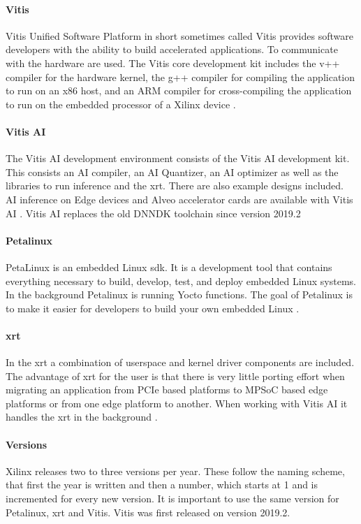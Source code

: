 \paragraph{Vitis}
Vitis Unified Software Platform in short sometimes called Vitis provides software developers with the ability to build accelerated applications.
To communicate with the hardware  are used.
The Vitis core development kit includes the v++ compiler for the hardware kernel, the g++ compiler for compiling the application to run on an x86 host, and an ARM compiler for cross-compiling the application to run on the embedded processor of a Xilinx device \cite{vitis_user_guide}.

\paragraph{Vitis AI}
The Vitis AI development environment consists of the Vitis AI development kit.
This consists an AI compiler, an AI Quantizer, an AI optimizer as well as the libraries to run inference and the \acrfull{xrt}.
There are also example designs included.
AI inference on Edge devices and Alveo accelerator cards are available with Vitis AI \cite{vitis_ai_user_guide}.
Vitis AI replaces the old DNNDK toolchain since version 2019.2 

\paragraph{Petalinux}
PetaLinux is an embedded Linux \acrfull{sdk}.
It is a development tool that contains everything necessary to build, develop, test, and deploy embedded Linux systems.
In the background Petalinux is running Yocto functions.
The goal of Petalinux is to make it easier for developers to build your own embedded Linux \cite{petalinux_user_guide}.

\paragraph{\acrfull{xrt}}
In the \acrfull{xrt} a combination of userspace and kernel driver components are included.
The advantage of \acrshort{xrt} for the user is that there is very little porting effort when migrating an application from PCIe based platforms to MPSoC based edge platforms or from one edge platform to another.
When working with Vitis AI it handles the \acrshort{xrt} in the background \cite{xrt_overview}.

\paragraph{Versions}
Xilinx releases two to three versions per year.
These follow the naming scheme, that first the year is written and then a number, which starts at 1 and is incremented for every new version.
It is important to use the same version for Petalinux, \acrshort{xrt} and Vitis.
Vitis was first released on version 2019.2.

